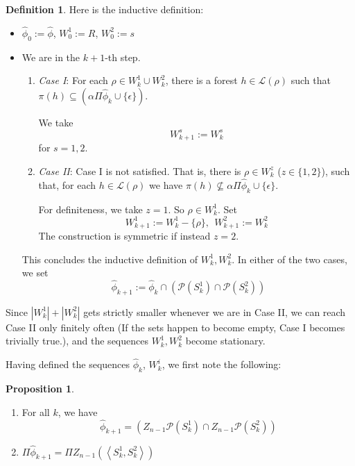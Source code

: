 \documentclass[sigplan,9pt]{acmart}\settopmatter{printfolios=true,printccs=false,printacmref=false}
\newcounter{thm}
\newcounter{theorem}
\theoremstyle{definition}
\newtheorem{defin}[thm]{Definition}
\newtheorem{prop}[thm]{Proposition}
\newcommand{\La}[0]{{\mathcal{L}}}
\newcommand{\Pa}[0]{{\mathcal{P}}}
\newcommand{\Rnm}[0]{Z_{n-1}}
\begin{document}
\begin{defin}
Here is the inductive definition:
\begin{itemize}
\item $\widehat{\phi}_0 := \widehat{\phi}$, $W^1_0 := R$, $W^2_0 := s$ %

\item  We are in the $k+1$-th step.

\begin{enumerate}
\item \emph{Case I}: For each $\rho \in W^1_k \cup W^2_k$, there is a forest $h \in \La(\rho)$ such that $\pi(h) \subseteq \left(\alpha \Pi \widehat{\phi}_k \cup \{\epsilon\}\right)$.

We take $$W^s_{k+1} := W^s_k$$ for $s = 1,2$.%

\item \emph{Case II}: Case I is not satisfied. That is, there is $\rho \in W^z_k$ ($z \in \{1,2\}$), such that, for each $h \in \La(\rho)$ we have $\pi(h) \not\subseteq \alpha \Pi \widehat{\phi}_k \cup \{\epsilon\}$.

For definiteness, we take $z = 1$. So $\rho \in W^1_k$. 
Set $$W^1_{k+1} := W^1_k - \{\rho\},\ \ W^2_{k+1} := W^2_k$$
The construction is symmetric if instead $z=2$.
\end{enumerate}
This concludes the inductive definition of $W^1_k, W^2_k$. In either of the two cases, we set $$\widehat{\phi}_{k+1} := \widehat{\phi}_{k} \cap \left(\Pa(S^1_{k}) \cap \Pa(S^2_{k})\right)$$





\end{itemize}
\end{defin}

Since $|W^1_k| + |W^2_k|$ gets strictly smaller whenever we are in Case II, we can reach Case II only finitely often (If the sets happen to become empty, Case I becomes trivially true.), and the sequences $W^1_k, W^2_k$ become stationary.

Having defined the sequences $\widehat{\phi}_k$, $W^i_k$, we first note the following: 

\begin{prop}\label{b:second}
\begin{enumerate}
\item  For all $k$, we have $$\widehat{\phi}_{k+1} = \left(\Rnm\Pa(S^1_k) \cap \Rnm\Pa(S^2_k)\right)$$
\item \label{b:seventh} $\Pi \widehat{\phi}_{k+1} = \Pi  \Rnm \left(\left\langle S^1_k, S^2_k    \right\rangle\right)$
\end{enumerate}
\end{prop}
\end{document}
